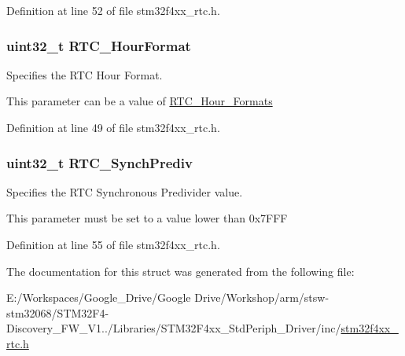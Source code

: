 Definition at line 52 of file stm32f4xx\-\_\-rtc.\-h.

\hypertarget{struct_r_t_c___init_type_def_a0db37d58422ac673ed23f89a3f4a9112}{
\subsubsection[{R\-T\-C\-\_\-\-Hour\-Format}]{\setlength{\rightskip}{0pt plus 5cm}uint32\-\_\-t R\-T\-C\-\_\-\-Hour\-Format}}\label{struct_r_t_c___init_type_def_a0db37d58422ac673ed23f89a3f4a9112}
\begin{DoxyVerb} Specifies the RTC Hour Format.
\end{DoxyVerb}
 This parameter can be a value of \hyperlink{group___r_t_c___hour___formats}{R\-T\-C\-\_\-\-Hour\-\_\-\-Formats} 

Definition at line 49 of file stm32f4xx\-\_\-rtc.\-h.

\hypertarget{struct_r_t_c___init_type_def_a241b299970511c34443ce3b13ce131ac}{
\subsubsection[{R\-T\-C\-\_\-\-Synch\-Prediv}]{\setlength{\rightskip}{0pt plus 5cm}uint32\-\_\-t R\-T\-C\-\_\-\-Synch\-Prediv}}\label{struct_r_t_c___init_type_def_a241b299970511c34443ce3b13ce131ac}
\begin{DoxyVerb} Specifies the RTC Synchronous Predivider value.
\end{DoxyVerb}
 This parameter must be set to a value lower than 0x7\-F\-F\-F 

Definition at line 55 of file stm32f4xx\-\_\-rtc.\-h.



The documentation for this struct was generated from the following file\-:\begin{DoxyCompactItemize}
\item 
E\-:/\-Workspaces/\-Google\-\_\-\-Drive/\-Google Drive/\-Workshop/arm/stsw-\/stm32068/\-S\-T\-M32\-F4-\/\-Discovery\-\_\-\-F\-W\-\_\-\-V1../\-Libraries/\-S\-T\-M32\-F4xx\-\_\-\-Std\-Periph\-\_\-\-Driver/inc/\hyperlink{stm32f4xx__rtc_8h}{stm32f4xx\-\_\-rtc.\-h}\end{DoxyCompactItemize}
